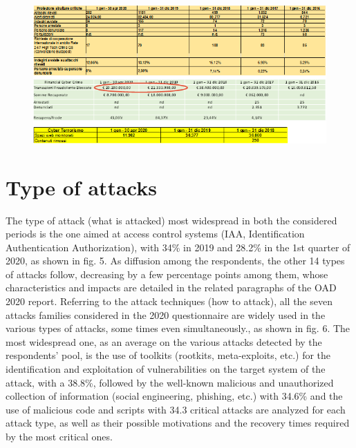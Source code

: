 \documentclass{easychair}
\begin{document}
\begin{figure}
	\centering
		\includegraphics[width=1\textwidth]{pictures/fig4.png}
		\caption{}
		\label{fig:4}
\end{figure}

\section{Type of attacks}\label{sec:TypeAttacks}

The type of attack (what is attacked) most widespread in both the considered periods is the one aimed at access control systems (IAA, Identification Authentication Authorization), 
with 34\% in 2019 and 28.2\% in the 1st quarter of 2020, as shown in fig. 5. As diffusion among the respondents, the other 14 types of attacks follow, decreasing by a few percentage
points among them, whose characteristics and impacts are detailed in the related paragraphs of the OAD 2020 report. Referring to the attack techniques (how to attack), all the seven
attacks families considered in the 2020 questionnaire are widely used in the various types of attacks, some times even simultaneously., as shown in fig. 6. The most widespread one,
as an average on the various attacks detected by the respondents’ pool, is the use of toolkits (rootkits, meta-exploits, etc.) for the identification and exploitation of vulnerabilities
on the target system of the attack, with a 38.8\%, followed by the well-known malicious and unauthorized collection of information (social engineering, phishing, etc.) with 34.6\% 
and the use of malicious code and scripts with 34.3%
critical attacks are analyzed for each attack type, as well as their possible motivations and the recovery times required by the most critical ones.
\end{document}
